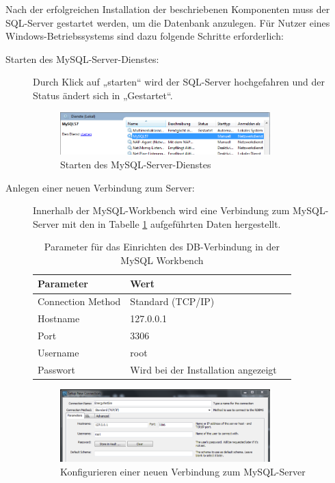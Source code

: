 \documentclass[12pt,titlepage]{article}
\begin{document}
Nach der erfolgreichen Installation der beschriebenen Komponenten muss der SQL-Server gestartet werden, um die Datenbank anzulegen. Für Nutzer eines Windows-Betriebssystems sind dazu folgende Schritte erforderlich:

\begin{description}
\item [Starten des MySQL-Server-Dienstes:]
Durch Klick auf „starten“ wird der SQL-Server hochgefahren und der Status ändert sich in „Gestartet“.
\begin{figure}[!ht]
	\centering
	\includegraphics[width=0.8\textwidth]{ErgSoftwareInst2}
	\caption{Starten des MySQL-Server-Dienstes}
	\label{fig:ErgSoftwareInst2}
\end{figure}
\item [Anlegen einer neuen Verbindung zum Server:]
Innerhalb der MySQL-Workbench wird eine Verbindung zum MySQL-Server mit den in Tabelle \ref{tab:mysql} aufgeführten Daten hergestellt.
\begin{table}[htp!]
\centering
	 \begin{tabular}{|l|l|l|}
	 \hline
	Parameter & Wert\\
	\hline
	\hline
	Connection Method & Standard (TCP/IP)\\
	 \hline
	Hostname & 127.0.0.1\\
	 \hline
	Port & 3306\\
	 \hline
	Username & root\\
	 \hline
	Passwort & Wird bei der Installation angezeigt\\
	 \hline
	 \end{tabular}
\caption{Parameter für das Einrichten des DB-Verbindung in der MySQL Workbench}
\label{tab:mysql}
\end{table}
\begin{figure}[!ht]
	\centering
	\includegraphics[width=0.8\textwidth]{ErgSoftwareInst3}
	\caption{Konfigurieren einer neuen Verbindung zum MySQL-Server}

\end{figure}
\end{description}
\end{document}
